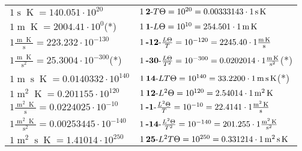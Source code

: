 \begin{center}
\begin{longtable}{l l}
{\color{black}$1 \bm{\mathrm{ }}\operatorname{s}\operatorname{K} = 140.051\cdot10^{20} $}&
	{\color{black}$1\:\text{\textbf{2}-} T\Theta=10^{20} = 0.00333143 \cdot 1 \bm{\mathrm{ }}\operatorname{s}\operatorname{K}$}\\
{\color{black}$1 \bm{\mathrm{ }}\operatorname{m}\operatorname{K} = 2004.41\cdot10^{0} $}\quad(*)&
	{\color{black}$1\:\text{\textbf{1}-} L\Theta=10^{10} = 254.501 \cdot 1 \bm{\mathrm{ }}\operatorname{m}\operatorname{K}$}\\
{\color{black}$1 \bm{\mathrm{ }}\frac{\operatorname{m}\operatorname{K}}{\operatorname{s}} = 223.232\cdot10^{-130} $}&
	{\color{black}$1\:\text{\textbf{-12}-} \frac{L\Theta}{T}=10^{-120} = 2245.40 \cdot 1 \bm{\mathrm{ }}\frac{\operatorname{m}\operatorname{K}}{\operatorname{s}}$}\\
{\color{black}$1 \bm{\mathrm{ }}\frac{\operatorname{m}\operatorname{K}}{\operatorname{s}^2} = 25.3004\cdot10^{-300} $}\quad(*)&
	{\color{black}$1\:\text{\textbf{-30}-} \frac{L\Theta}{T^2}=10^{-300} = 0.0202014 \cdot 1 \bm{\mathrm{ }}\frac{\operatorname{m}\operatorname{K}}{\operatorname{s}^2}$}\quad(*)\\
{\color{black}$1 \bm{\mathrm{ }}\operatorname{m}\operatorname{s}\operatorname{K} = 0.0140332\cdot10^{140} $}&
	{\color{black}$1\:\text{\textbf{14}-} LT\Theta=10^{140} = 33.2200 \cdot 1 \bm{\mathrm{ }}\operatorname{m}\operatorname{s}\operatorname{K}$}\quad(*)\\
{\color{black}$1 \bm{\mathrm{ }}\operatorname{m}^2\operatorname{K} = 0.201155\cdot10^{120} $}&
	{\color{black}$1\:\text{\textbf{12}-} L^2\Theta=10^{120} = 2.54014 \cdot 1 \bm{\mathrm{ }}\operatorname{m}^2\operatorname{K}$}\\
{\color{black}$1 \bm{\mathrm{ }}\frac{\operatorname{m}^2\operatorname{K}}{\operatorname{s}} = 0.0224025\cdot10^{-10} $}&
	{\color{black}$1\:\text{\textbf{-1}-} \frac{L^2\Theta}{T}=10^{-10} = 22.4141 \cdot 1 \bm{\mathrm{ }}\frac{\operatorname{m}^2\operatorname{K}}{\operatorname{s}}$}\\
{\color{black}$1 \bm{\mathrm{ }}\frac{\operatorname{m}^2\operatorname{K}}{\operatorname{s}^2} = 0.00253445\cdot10^{-140} $}&
	{\color{black}$1\:\text{\textbf{-14}-} \frac{L^2\Theta}{T^2}=10^{-140} = 201.255 \cdot 1 \bm{\mathrm{ }}\frac{\operatorname{m}^2\operatorname{K}}{\operatorname{s}^2}$}\\
{\color{black}$1 \bm{\mathrm{ }}\operatorname{m}^2\operatorname{s}\operatorname{K} = 1.41014\cdot10^{250} $}&
	{\color{black}$1\:\text{\textbf{25}-} L^2T\Theta=10^{250} = 0.331214 \cdot 1 \bm{\mathrm{ }}\operatorname{m}^2\operatorname{s}\operatorname{K}$}\\

\end{longtable}
\end{center}
